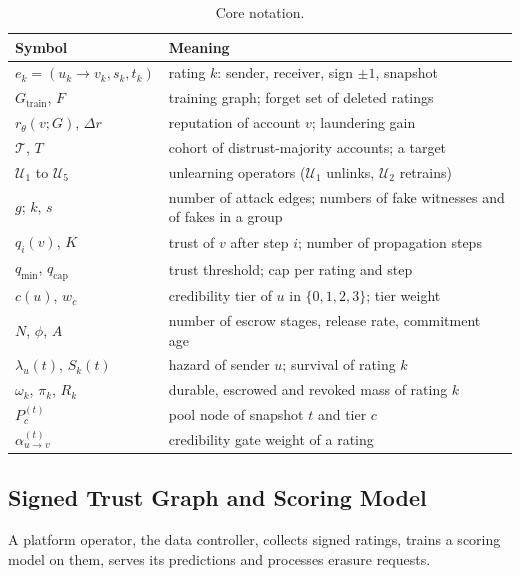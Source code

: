 \documentclass[lettersize,journal]{IEEEtran}
\begin{document}
\begin{table}[!t]
\caption{Core notation.}
\label{tab:notation}
\centering
\footnotesize
\setlength{\tabcolsep}{3pt}
\begin{tabular}{@{}l>{\raggedright\arraybackslash}p{}@{}}
\toprule
\textbf{Symbol} & \textbf{Meaning} \\
\midrule
$e_k = (u_k \to v_k, s_k, t_k)$ & rating $k$: sender, receiver, sign $\pm 1$, snapshot \\
$G_{\mathrm{train}}$, $F$ & training graph; forget set of deleted ratings \\
$r_\theta(v; G)$, $\Delta r$ & reputation of account $v$; laundering gain \\
$\mathcal{T}$, $T$ & cohort of distrust-majority accounts; a target \\
$\mathcal{U}_1$ to $\mathcal{U}_5$ & unlearning operators ($\mathcal{U}_1$ unlinks, $\mathcal{U}_2$ retrains) \\
$g$; $k$, $s$ & number of attack edges; numbers of fake witnesses and of fakes in a group \\
$q_i(v)$, $K$ & trust of $v$ after step $i$; number of propagation steps \\
$q_{\min}$, $q_{\mathrm{cap}}$ & trust threshold; cap per rating and step \\
$c(u)$, $w_c$ & credibility tier of $u$ in $\{0,1,2,3\}$; tier weight \\
$N$, $\phi$, $A$ & number of escrow stages, release rate, commitment age \\
$\lambda_u(t)$, $S_k(t)$ & hazard of sender $u$; survival of rating $k$ \\
$\omega_k$, $\pi_k$, $R_k$ & durable, escrowed and revoked mass of rating $k$ \\
$P^{(t)}_c$ & pool node of snapshot $t$ and tier $c$ \\
$\alpha^{(t)}_{u \to v}$ & credibility gate weight of a rating \\
\bottomrule
\end{tabular}
\end{table}

\subsection{Signed Trust Graph and Scoring Model}
\label{subsec:prelim}

A platform operator, the data controller, collects signed ratings, trains a scoring model on them, serves its predictions and processes erasure requests.
\end{document}
